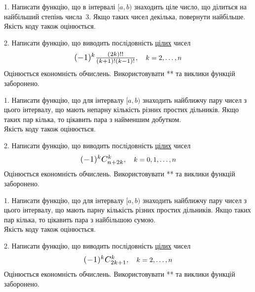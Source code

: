 \documentclass[12pt, ukrainian]{article}
\begin{document}



\begin {Large}
1. Написати функцію, що в інтервалі $[a, b)$ знаходить ціле число, що ділиться на найбільший степінь числа 3. Якщо таких чисел декілька, повернути найбільше.\\	Якість коду також оцінюється. 



\vspace{10mm}

\newpage

2. 
Написати функцію, що виводить послідовність \underline{цілих} чисел
$$\scalebox{1.2}{$(-1)^{k}\frac{(2k)!!}{(k+1)!(k-1)!}$}, \quad k=2,\ldots,n$$
Оцінюється економність обчислень. Використовувати ** та виклики функцій заборонено.

\end {Large}\newpage




\begin {Large}
1. Написати функцію, що для інтервалу $[a, b)$ знаходить найближчу пару чисел з цього інтервалу, що мають непарну кількість різних простих дільників. Якщо таких пар кілька, то цікавить пара з найменшим добутком.\\	Якість коду також оцінюється. 



\vspace{10mm}

\newpage

2. 
Написати функцію, що виводить послідовність \underline{цілих} чисел
$$\scalebox{1.2}{$(-1)^{k}C_{n+2k}^{k}$}, \quad k=0,1,\ldots,n$$
Оцінюється економність обчислень. Використовувати ** та виклики функцій заборонено.

\end {Large}\newpage




\begin {Large}
1. Написати функцію, що для інтервалу $[a, b)$ знаходить найближчу пару чисел з цього інтервалу, що мають парну кількість різних простих дільників. Якщо таких пар кілька, то цікавить пара з найбільшою сумою.\\	Якість коду також оцінюється. 



\vspace{10mm}

\newpage

2. 
Написати функцію, що виводить послідовність \underline{цілих} чисел
$$\scalebox{1.2}{$(-1)^{k}C_{2k+1}^{k}$}, \quad k=2,\ldots,n$$
Оцінюється економність обчислень. Використовувати ** та виклики функцій заборонено.

\end {Large}\newpage
\end{document}
